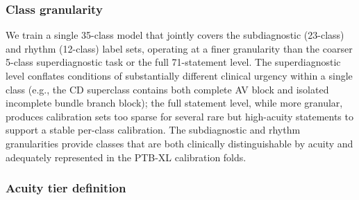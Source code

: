 %
%

\subsubsection{Class granularity}
\label{sec:granularity}

We train a single 35-class model that jointly covers the subdiagnostic (23-class)
and rhythm (12-class) label sets, operating at a finer granularity than the coarser
5-class superdiagnostic task or the full 71-statement level.
The superdiagnostic level conflates conditions of substantially different clinical
urgency within a single class (e.g., the CD superclass contains both complete AV
block and isolated incomplete bundle branch block); the full statement level, while
more granular, produces calibration sets too sparse for several rare but high-acuity
statements to support a stable per-class calibration.
The subdiagnostic and rhythm granularities provide classes that are both clinically
distinguishable by acuity and adequately represented in the PTB-XL calibration folds.

\subsubsection{Acuity tier definition}
\label{sec:tiers}


